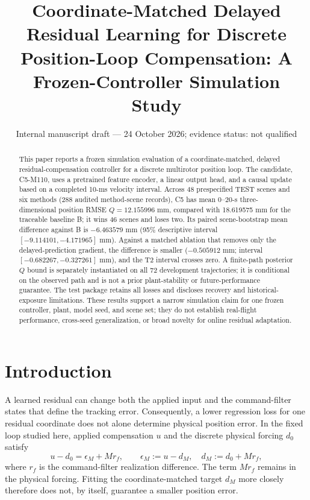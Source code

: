 \documentclass[11pt]{article}
\title{Coordinate-Matched Delayed Residual Learning for Discrete Position-Loop Compensation: A Frozen-Controller Simulation Study}
\author{}
\date{Internal manuscript draft --- 24 October 2026; evidence status: not qualified}
\begin{document}
\maketitle

\begin{abstract}
This paper reports a frozen simulation evaluation of a coordinate-matched, delayed residual-compensation controller for a discrete multirotor position loop. The candidate, C5-M110, uses a pretrained feature encoder, a linear output head, and a causal update based on a completed 10-ms velocity interval. Across 48 prespecified TEST scenes and six methods (288 audited method-scene records), C5 has mean 0--20-s three-dimensional position RMSE $Q=12.155996$ mm, compared with 18.619575 mm for the traceable baseline B; it wins 46 scenes and loses two. Its paired scene-bootstrap mean difference against B is $-6.463579$ mm (95\% descriptive interval $[-9.114101,-4.171965]$ mm). Against a matched ablation that removes only the delayed-prediction gradient, the difference is smaller ($-0.505912$ mm; interval $[-0.682267,-0.327261]$ mm), and the T2 interval crosses zero. A finite-path posterior $Q$ bound is separately instantiated on all 72 development trajectories; it is conditional on the observed path and is not a prior plant-stability or future-performance guarantee. The test package retains all losses and discloses recovery and historical-exposure limitations. These results support a narrow simulation claim for one frozen controller, plant, model seed, and scene set; they do not establish real-flight performance, cross-seed generalization, or broad novelty for online residual adaptation.
\end{abstract}

\section{Introduction}
A learned residual can change both the applied input and the command-filter states that define the tracking error. Consequently, a lower regression loss for one residual coordinate does not alone determine physical position error. In the fixed loop studied here, applied compensation $u$ and the discrete physical forcing $d_0$ satisfy
\begin{equation}
  u-d_0 = \epsilon_M + M r_f, \qquad
  \epsilon_M := u-d_M, \quad d_M := d_0+M r_f,
  \label{eq:physical-coordinate}
\end{equation}
where $r_f$ is the command-filter realization difference. The term $M r_f$ remains in the physical forcing. Fitting the coordinate-matched target $d_M$ more closely therefore does not, by itself, guarantee a smaller position error.
\end{document}
